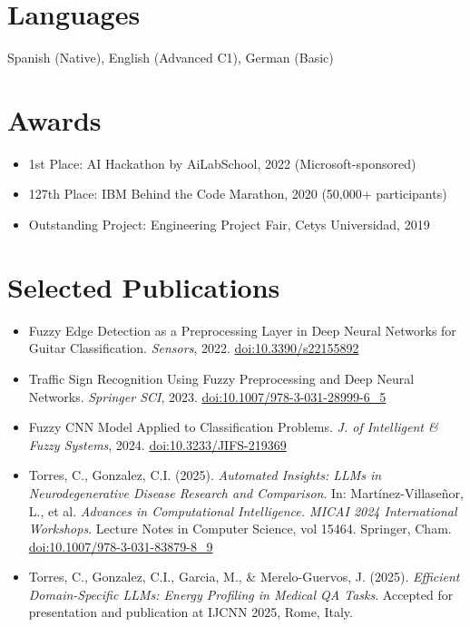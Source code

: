 \documentclass[letterpaper,11pt]{article}
\newcommand{\resumeItem}[1]{\item{\small{#1}}}
\begin{document}
\section*{Languages}
Spanish (Native), English (Advanced C1), German (Basic)

\section*{Awards}
\begin{itemize}[leftmargin=0.15in]
  \resumeItem{1st Place: AI Hackathon by AiLabSchool, 2022 (Microsoft-sponsored)}
  \resumeItem{127th Place: IBM Behind the Code Marathon, 2020 (50,000+ participants)}
  \resumeItem{Outstanding Project: Engineering Project Fair, Cetys Universidad, 2019}
\end{itemize}

\section*{Selected Publications}
\begin{itemize}[leftmargin=0.15in]
  \item Fuzzy Edge Detection as a Preprocessing Layer in Deep Neural Networks for Guitar Classification. \textit{Sensors}, 2022. \href{https://doi.org/10.3390/s22155892}{doi:10.3390/s22155892}
  \item Traffic Sign Recognition Using Fuzzy Preprocessing and Deep Neural Networks. \textit{Springer SCI}, 2023. \href{https://doi.org/10.1007/978-3-031-28999-6_5}{doi:10.1007/978-3-031-28999-6\_5}
  \item Fuzzy CNN Model Applied to Classification Problems. \textit{J. of Intelligent \& Fuzzy Systems}, 2024. \href{http://doi.org/10.3233/JIFS-219369}{doi:10.3233/JIFS-219369}
  \item Torres, C., Gonzalez, C.I. (2025). \textit{Automated Insights: LLMs in Neurodegenerative Disease Research and Comparison}. In: Martínez-Villaseñor, L., et al. \textit{Advances in Computational Intelligence. MICAI 2024 International Workshops}. Lecture Notes in Computer Science, vol 15464. Springer, Cham. \href{https://doi.org/10.1007/978-3-031-83879-8_9}{doi:10.1007/978-3-031-83879-8\_9}
  \item Torres, C., Gonzalez, C.I., Garcia, M., \& Merelo-Guervos, J. (2025). \textit{Efficient Domain-Specific LLMs: Energy Profiling in Medical QA Tasks}. Accepted for presentation and publication at IJCNN 2025, Rome, Italy.
\end{itemize}
\end{document}
